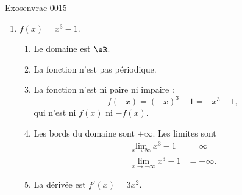 \begin{corrige}{Exosenvrac-0015}

    \begin{enumerate}
        \item
            \( f(x)=x^3-1\).
            \begin{enumerate}
                \item
                    Le domaine est \( \eR\).
                  \item La fonction n'est pas p\'eriodique. 
                \item
                    La fonction n'est ni paire ni impaire :
                    \begin{equation}
                        f(-x)=(-x)^3-1=-x^3-1,
                    \end{equation}
                    qui n'est ni \( f(x)\) ni \( -f(x)\).
                \item
                    Les bords du domaine sont \( \pm\infty\). Les limites sont
                    \begin{subequations}
                        \begin{align}
                            \lim_{x\to \infty} x^3-1&=\infty\\
                            \lim_{x\to -\infty} x^3-1&=-\infty.
                        \end{align}
                    \end{subequations}
                \item
                    La dérivée est \( f'(x)=3x^2\).


\end{enumerate}
\end{enumerate}
\end{corrige}
